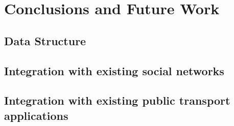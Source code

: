 \chapter{Conclusions and Future Work} \label{chap:chap7}

\section{Data Structure}

\section{Integration with existing social networks}

\section{Integration with existing public transport applications}


